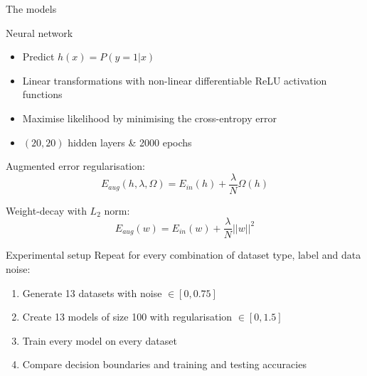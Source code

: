 \documentclass[9.5pt]{beamer}
\begin{document}
    \begin{frame}{The models}
        \begin{block}{Neural network}
            \small
            \begin{itemize}
                \item Predict $h(x) = P(y = 1 | x)$
                \item Linear transformations with non-linear differentiable ReLU activation functions
                \item Maximise likelihood by minimising the cross-entropy error
                \item $(20, 20)$ hidden layers \& 2000 epochs
            \end{itemize}
        \end{block}

        Augmented error regularisation:
        \[E_{aug}(h, \lambda, \Omega) = E_{in}(h) + \dfrac{\lambda}{N}\Omega(h)\]

        Weight-decay with $L_2$ norm:
        \[E_{aug}(w) = E_{in}(w) + \dfrac{\lambda}{N} ||w||^2\]
    \end{frame}

    \begin{frame}{Experimental setup}
        Repeat for every combination of dataset type, label and data noise:
        \begin{enumerate}
            \item Generate 13 datasets with noise $\in [0, 0.75]$
            \item Create 13 models of size 100 with regularisation $\in [0, 1.5]$
            \item Train every model on every dataset
            \item Compare decision boundaries and training and testing accuracies
        \end{enumerate}
    \end{frame}
\end{document}
